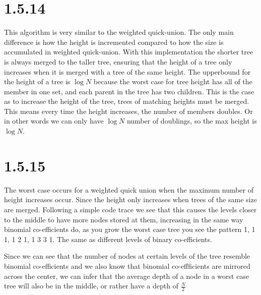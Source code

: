 \documentclass[12pt]{article}
\begin{document}
\section*{1.5.14}

This algorithm is very similar to the weighted quick-union. The only main
difference is how the height is incremented compared to how the size is 
accumulated in weighted quick-union. With this implementation the shorter 
tree is always merged to the taller tree, ensuring that the height of a tree
only increases when it is merged with a tree of the same height. The upperbound
for the height of a tree is $ \log N$ because the worst case for tree height has
all of the member in one set, and each parent in the tree has two children. This
is the case as to increase the height of the tree, trees of matching heights 
must be merged. This means every time the height increases, the number of members
doubles. Or in other words we can only have $\log N$ number of doublings, so the
max height is $\log N$.


\noindent 
\section*{1.5.15}

The worst case occurs for a weighted quick union when the maximum number of
height increases occur. Since the height only increases when trees of the
same size are merged. Following a simple code trace we see that this causes 
the levels closer to the middle to have more nodes stored at them, increasing 
in the same way binomial co-efficients do, as you grow the worst case tree you
see the pattern 1, 1 1, 1 2 1, 1 3 3 1. The same as different levels of binary
co-efficients.

Since we can see that the number of nodes at certain levels of the tree resemble
binomial co-efficients and we also know that binomial co-effficients are 
mirrored across the center, we can infer that the average depth of a node in
a worst case tree will also be in the middle, or rather have a depth of $\frac{N}{2}$
\end{document}
